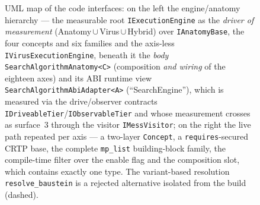 \begin{nurlang}
\begin{figure}[htbp]
\begin{tikzpicture}
\end{tikzpicture}
\caption{UML map of the code interfaces: on the left the engine/anatomy hierarchy --- the measurable root \texttt{IExecutionEngine} as the \emph{driver of measurement} (Anatomy\,$\cup$\,Virus\,$\cup$\,Hybrid) over \texttt{IAnatomyBase}, the four concepts and six families and the axis-less \texttt{IVirus\-Execution\-Engine}, beneath it the \emph{body} \texttt{Search\-Algorithm\-Anatomy<C>} (composition \emph{and wiring} of the eighteen axes) and its ABI runtime view \texttt{Search\-Algorithm\-Abi\-Adapter<A>} (\enquote{SearchEngine}), which is measured via the drive/observer contracts \texttt{IDriveableTier}/\texttt{IObservableTier} and whose measurement crosses as surface~3 through the visitor \texttt{IMessVisitor}; on the right the live path repeated per axis --- a two-layer \texttt{Concept}, a \texttt{requires}-secured CRTP base, the complete \texttt{mp\_list} building-block family, the compile-time filter over the enable flag and the composition slot, which contains exactly one type. The variant-based resolution \texttt{resolve\_baustein} is a rejected alternative isolated from the build (dashed).}\label{fig:uml-interfaces}
\end{figure}
\end{nurlang}

